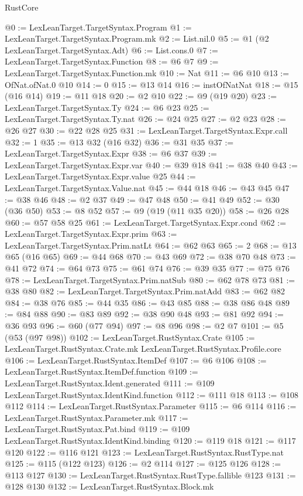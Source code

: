 \begin{lexlean}{RustCore}
\begin{coremodule}
@0 := LexLeanTarget.TargetSyntax.Program
@1 := LexLeanTarget.TargetSyntax.Program.mk
@2 := List.nil.{0}
@5 := @1 (@2 LexLeanTarget.TargetSyntax.Adt)
@6 := List.cons.{0}
@7 := LexLeanTarget.TargetSyntax.Function
@8 := @6 @7
@9 := LexLeanTarget.TargetSyntax.Function.mk
@10 := Nat
@11 := @6 @10
@13 := OfNat.ofNat.{0} @10
@14 := 0
@15 := @13 @14
@16 := instOfNatNat
@18 := @15 (@16 @14)
@19 := @11 @18
@20 := @2 @10
@22 := @9 (@19 @20)
@23 := LexLeanTarget.TargetSyntax.Ty
@24 := @6 @23
@25 := LexLeanTarget.TargetSyntax.Ty.nat
@26 := @24 @25
@27 := @2 @23
@28 := @26 @27
@30 := @22 @28 @25
@31 := LexLeanTarget.TargetSyntax.Expr.call
@32 := 1
@35 := @13 @32 (@16 @32)
@36 := @31 @35
@37 := LexLeanTarget.TargetSyntax.Expr
@38 := @6 @37
@39 := LexLeanTarget.TargetSyntax.Expr.var
@40 := @39 @18
@41 := @38 @40
@43 := LexLeanTarget.TargetSyntax.Expr.value @25
@44 := LexLeanTarget.TargetSyntax.Value.nat
@45 := @44 @18
@46 := @43 @45
@47 := @38 @46
@48 := @2 @37
@49 := @47 @48
@50 := @41 @49
@52 := @30 (@36 @50)
@53 := @8 @52
@57 := @9 (@19 (@11 @35 @20))
@58 := @26 @28
@60 := @57 @58 @25
@61 := LexLeanTarget.TargetSyntax.Expr.cond
@62 := LexLeanTarget.TargetSyntax.Expr.prim
@63 := LexLeanTarget.TargetSyntax.Prim.natLt
@64 := @62 @63
@65 := 2
@68 := @13 @65 (@16 @65)
@69 := @44 @68
@70 := @43 @69
@72 := @38 @70 @48
@73 := @41 @72
@74 := @64 @73
@75 := @61 @74
@76 := @39 @35
@77 := @75 @76
@78 := LexLeanTarget.TargetSyntax.Prim.natSub
@80 := @62 @78 @73
@81 := @38 @80
@82 := LexLeanTarget.TargetSyntax.Prim.natAdd
@83 := @62 @82
@84 := @38 @76
@85 := @44 @35
@86 := @43 @85
@88 := @38 @86 @48
@89 := @84 @88
@90 := @83 @89
@92 := @38 @90 @48
@93 := @81 @92
@94 := @36 @93
@96 := @60 (@77 @94)
@97 := @8 @96
@98 := @2 @7
@101 := @5 (@53 (@97 @98))
@102 := LexLeanTarget.RustSyntax.Crate
@105 := LexLeanTarget.RustSyntax.Crate.mk LexLeanTarget.RustSyntax.Profile.core
@106 := LexLeanTarget.RustSyntax.ItemDef
@107 := @6 @106
@108 := LexLeanTarget.RustSyntax.ItemDef.function
@109 := LexLeanTarget.RustSyntax.Ident.generated
@111 := @109 LexLeanTarget.RustSyntax.IdentKind.function
@112 := @111 @18
@113 := @108 @112
@114 := LexLeanTarget.RustSyntax.Parameter
@115 := @6 @114
@116 := LexLeanTarget.RustSyntax.Parameter.mk
@117 := LexLeanTarget.RustSyntax.Pat.bind
@119 := @109 LexLeanTarget.RustSyntax.IdentKind.binding
@120 := @119 @18
@121 := @117 @120
@122 := @116 @121
@123 := LexLeanTarget.RustSyntax.RustType.nat
@125 := @115 (@122 @123)
@126 := @2 @114
@127 := @125 @126
@128 := @113 @127
@130 := LexLeanTarget.RustSyntax.RustType.fallible @123
@131 := @128 @130
@132 := LexLeanTarget.RustSyntax.Block.mk

\end{coremodule}
\end{lexlean}
